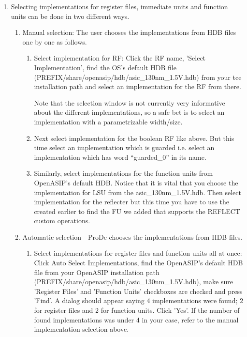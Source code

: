 \documentclass[a4paper,twoside]{tceusermanual}
\begin{document}
\begin{enumerate}
\item%
Selecting implementations for register files, immediate units and function
units can be done in two different ways.

\begin{enumerate}
\item%
Manual selection: The user chooses the implementations from HDB files one
by one as follows.

\begin{enumerate}
\item%
Select implementation for RF: Click the RF name, 'Select Implementation',
find the OS's default HDB file (PREFIX/share/openasip/hdb/asic\_130nm\_1.5V.hdb) 
from your tce installation path and select an implementation for the RF from 
there.

Note that the selection window is not currently very informative about the
different implementations, so a safe bet is to select an implementation with
a parametrizable width/size.

\item%
Next select implementation for the boolean RF like above. But this time
select an implementation which is guarded i.e. select an implementation which
has word ``guarded\_0'' in its name.

\item%
Similarly, select implementations for the function units from OpenASIP's default
HDB. Notice that it is vital that you choose the implementation for LSU from
the asic\_130nm\_1.5V.hdb. Then select implementation for the reflecter but
this time you have to use the  created earlier to find the FU
we added that supports the REFLECT custom operations.
\end{enumerate}

\item%
Automatic selection - ProDe chooses the implementations from HDB files.

\begin{enumerate}
\item%
Select implementations for register files and function units all at once: 
Click Auto Select Implementations, find the OpenASIP's default HDB file from your 
OpenASIP installation path (PREFIX/share/openasip/hdb/asic\_130nm\_1.5V.hdb), make sure
'Register Files' and 'Function Units' checkboxes are checked and press 'Find'.
A dialog should appear saying 4 implementations were found; 2 for register
files and 2 for function units. Click 'Yes'. If the number of found
implementations was under 4 in your case, refer to the manual implementation 
selection above.


\end{enumerate}
\end{enumerate}
\end{enumerate}
\end{document}
